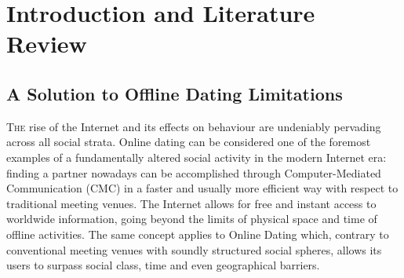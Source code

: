 
\lhead[\leftmark]{\leftmark}

\rhead[\leftmark]{}

\lfoot{}

\cfoot[\thepage]{\thepage}

\chapter{Introduction and Literature Review}

\section{A Solution to Offline Dating Limitations\label{sec:A-Solution-to}}

\lettrine{T}{he}{ rise of the Internet and its effects on behaviour are undeniably
pervading across all social strata. Online dating can be considered
one of the foremost examples of a fundamentally altered social activity
in the modern Internet era: finding a partner nowadays can be accomplished
through Computer-Mediated Communication (CMC) in a faster \textendash{}
and usually more efficient \textendash{} way with respect to traditional
meeting venues. The Internet allows for free and instant access to
worldwide information, going beyond the limits of physical space and
time of offline activities. The same concept applies to Online Dating
which, contrary to conventional meeting venues with soundly structured
social spheres, allows its users to surpass social class, time and
even geographical barriers.}

